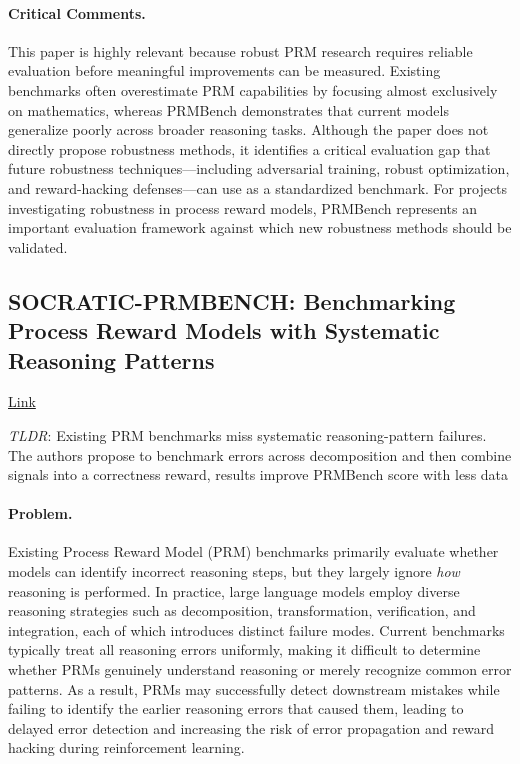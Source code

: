 \documentclass[11pt]{article}
\begin{document}
\paragraph{Critical Comments.}
This paper is highly relevant because robust PRM research requires reliable evaluation before meaningful improvements can be measured. Existing benchmarks often overestimate PRM capabilities by focusing almost exclusively on mathematics, whereas PRMBench demonstrates that current models generalize poorly across broader reasoning tasks. Although the paper does not directly propose robustness methods, it identifies a critical evaluation gap that future robustness techniques—including adversarial training, robust optimization, and reward-hacking defenses—can use as a standardized benchmark. For projects investigating robustness in process reward models, PRMBench represents an important evaluation framework against which new robustness methods should be validated.

\subsection{SOCRATIC-PRMBENCH: Benchmarking Process Reward Models with Systematic Reasoning Patterns}

\href{https://arxiv.org/abs/2505.23474}{Link}

\emph{TLDR}: Existing PRM benchmarks miss systematic reasoning-pattern failures. The authors propose to benchmark errors across decomposition and then combine signals into a correctness reward, results improve PRMBench score with less data

\paragraph{Problem.}
Existing Process Reward Model (PRM) benchmarks primarily evaluate whether models can identify incorrect reasoning steps, but they largely ignore \emph{how} reasoning is performed. In practice, large language models employ diverse reasoning strategies such as decomposition, transformation, verification, and integration, each of which introduces distinct failure modes. Current benchmarks typically treat all reasoning errors uniformly, making it difficult to determine whether PRMs genuinely understand reasoning or merely recognize common error patterns. As a result, PRMs may successfully detect downstream mistakes while failing to identify the earlier reasoning errors that caused them, leading to delayed error detection and increasing the risk of error propagation and reward hacking during reinforcement learning.  
\end{document}
